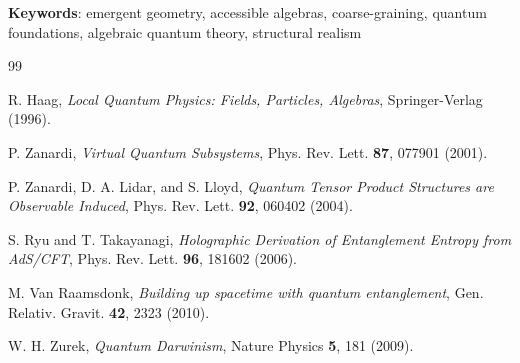 \documentclass[12pt,a4paper]{article}
\begin{document}
\bigskip

\noindent\textbf{Keywords}: emergent geometry, accessible algebras, coarse-graining, quantum foundations, algebraic quantum theory, structural realism

\newpage


\begin{thebibliography}{99}

R. Haag, \emph{Local Quantum Physics: Fields, Particles, Algebras}, Springer-Verlag (1996).

P. Zanardi, \emph{Virtual Quantum Subsystems}, Phys. Rev. Lett. \textbf{87}, 077901 (2001).

P. Zanardi, D. A. Lidar, and S. Lloyd, \emph{Quantum Tensor Product Structures are Observable Induced}, Phys. Rev. Lett. \textbf{92}, 060402 (2004).

S. Ryu and T. Takayanagi, \emph{Holographic Derivation of Entanglement Entropy from AdS/CFT}, Phys. Rev. Lett. \textbf{96}, 181602 (2006).

M. Van Raamsdonk, \emph{Building up spacetime with quantum entanglement}, Gen. Relativ. Gravit. \textbf{42}, 2323 (2010).

W. H. Zurek, \emph{Quantum Darwinism}, Nature Physics \textbf{5}, 181 (2009).

\end{thebibliography}
\end{document}
